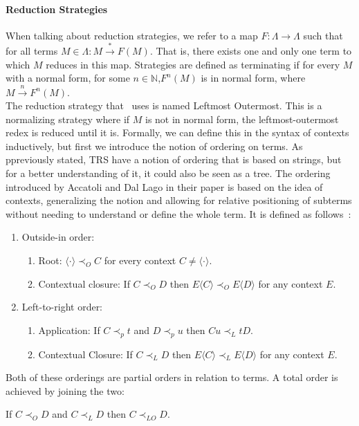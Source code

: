 \message{ !name(VU-CS-BSc-thesis-template.tex)}\documentclass[11pt]{article}
\begin{document}
\paragraph{Reduction Strategies}
When talking about reduction strategies, we refer to a map $F : \Lambda \rightarrow \Lambda$ such that for all terms $M \in \Lambda : M \xrightarrow{*} F(M)$. That is, there exists one and only one term to which $M$ reduces in this map. Strategies are defined as terminating if for every $M$ with a normal form, for some $n \in \mathbb{N}$,$ F^{n} (M)$ is in normal form, where $M \xrightarrow{n} F^n(M)$. \\
The reduction strategy that~\cite{beta-invariance} uses is named Leftmost Outermost. This is a normalizing strategy where if $M$ is not in normal form, the leftmost-outermost redex is reduced until it is. Formally, we can define this in the syntax of contexts inductively, but first we introduce the notion of ordering on terms. As ppreviously stated, TRS have a notion of ordering that is based on strings, but for a better understanding of it, it could also be seen as a tree. The ordering introduced by Accatoli and Dal Lago in their paper is based on the idea of contexts, generalizing the notion and allowing for relative positioning of subterms without needing to understand or define the whole term. It is defined as follows~\cite{beta-invariance}:
\begin{enumerate}
  \item Outside-in order:
        \begin{enumerate}
          \item Root: $\langle \cdot \rangle \prec_{O} C$ for every context $C \neq \langle \cdot \rangle$.
          \item Contextual closure: If $C \prec_{O} D$ then $E\langle C \rangle \prec_{O} E\langle D \rangle $ for any context $E$.
        \end{enumerate}
  \item Left-to-right order:
        \begin{enumerate}
          \item Application: If $C \prec_{p} t$ and $D \prec_{p} u$ then $Cu \prec_{L} tD$.
          \item Contextual Closure: If $C \prec_{L} D$ then  $E\langle C \rangle \prec_{L} E\langle D\rangle$ for any context $E$.
        \end{enumerate}
\end{enumerate}
Both of these orderings are partial orders in relation to terms. A total order is achieved by joining the two:
\begin{center}
  If $C \prec_{O} D$ and $C \prec_{L} D$ then $C \prec_{LO} D$.
\end{center}
\end{document}
